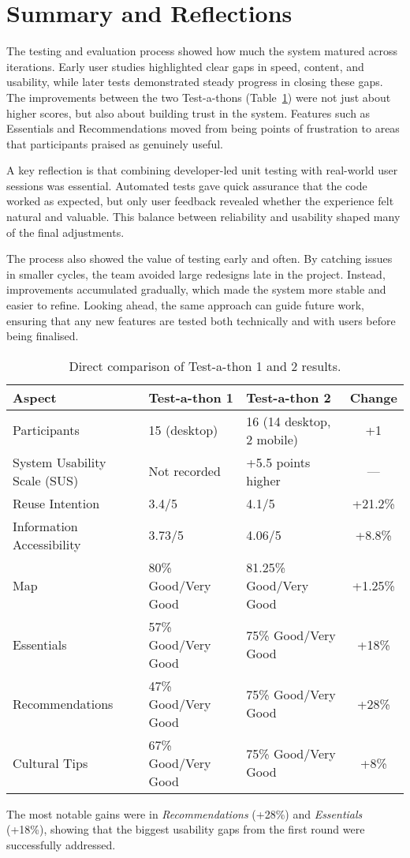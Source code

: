 \cleardoublepage


\section{Summary and Reflections}

The testing and evaluation process showed how much the system matured across iterations. 
Early user studies highlighted clear gaps in speed, content, and usability, while later tests 
demonstrated steady progress in closing these gaps. The improvements between the two 
Test-a-thons (Table~\ref{tab:testathon-comparison}) were not just about higher scores, 
but also about building trust in the system. Features such as Essentials and Recommendations 
moved from being points of frustration to areas that participants praised as genuinely useful. 

A key reflection is that combining developer-led unit testing with real-world user sessions 
was essential. Automated tests gave quick assurance that the code worked as expected, 
but only user feedback revealed whether the experience felt natural and valuable. 
This balance between reliability and usability shaped many of the final adjustments. 

The process also showed the value of testing early and often. By catching issues in smaller 
cycles, the team avoided large redesigns late in the project. Instead, improvements 
accumulated gradually, which made the system more stable and easier to refine. 
Looking ahead, the same approach can guide future work, ensuring that any new 
features are tested both technically and with users before being finalised.

\begin{table}[H]
\centering
\small
\caption{Direct comparison of Test-a-thon 1 and 2 results.}
\label{tab:testathon-comparison}
\begin{tabular}{|l|p{4cm}|p{4cm}|c|}
\hline
\textbf{Aspect} & \textbf{Test-a-thon 1} & \textbf{Test-a-thon 2} & \textbf{Change} \\
\hline
Participants & 15 (desktop) & 16 (14 desktop, 2 mobile) & +1 \\
\hline
System Usability Scale (SUS) & Not recorded & +5.5 points higher & — \\
\hline
Reuse Intention & 3.4/5 & 4.1/5 & +21.2\% \\
\hline
Information Accessibility & 3.73/5 & 4.06/5 & +8.8\% \\
\hline
Map & 80\% Good/Very Good & 81.25\% Good/Very Good & +1.25\% \\
\hline
Essentials & 57\% Good/Very Good & 75\% Good/Very Good & +18\% \\
\hline
Recommendations & 47\% Good/Very Good & 75\% Good/Very Good & +28\% \\
\hline
Cultural Tips & 67\% Good/Very Good & 75\% Good/Very Good & +8\% \\
\hline
\end{tabular}
\end{table}

\noindent The most notable gains were in \textit{Recommendations} (+28\%) and \textit{Essentials} (+18\%), 
showing that the biggest usability gaps from the first round were successfully addressed.